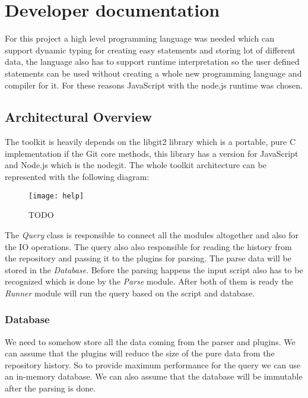 \chapter{Developer documentation}
\label{ch:impl}

For this project a high level programming language was needed which can support dynamic typing for creating easy statements and storing
lot of different data, the language also has to support runtime interpretation so the user defined statements can be used without
creating a whole new programming language and compiler for it. For these reasons JavaScript with the node.js runtime was chosen. 

\section{Architectural Overview}

The toolkit is heavily depends on the libgit2 \cite{libgit2} library which is a portable, pure C implementation  if the Git core methods,
this library has a version for JavaScript and Node.js which is the nodegit\cite{nodegit}.
The whole toolkit architecture can be represented with the following diagram:

\begin{figure}[H]
	\centering
	\texttt{[image: help]}
	\caption{TODO}
	\label{fig:fig-help}
\end{figure}

The \textit{Query} class is responsible to connect all the modules altogether and also for the IO operations. The query also also
responsible for reading the history from the repository and passing it to the plugins for parsing. The parse data will be stored
in the \textit{Database}. Before the parsing happens the input script also has to be recognized which is done by the \textit{Parse}
module. After both of them is ready the \textit{Runner} module will run the query based on the script and database.

\subsection{Database}

We need to somehow store all the data coming from the parser and plugins. We can assume that the plugins will reduce the size of the
pure data from the repository history. So to provide maximum performance for the query we can use an in-memory database. 
We can also assume that the database will be immutable after the parsing is done. 

